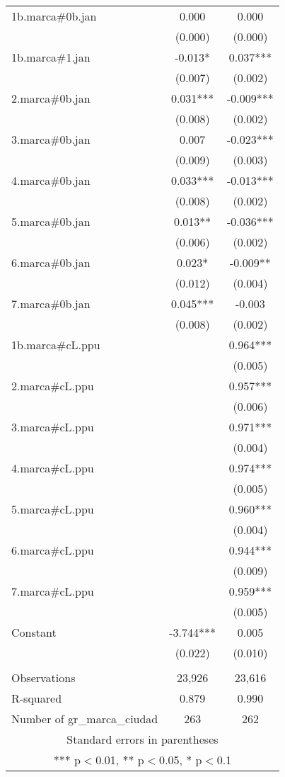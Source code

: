 \begin{tabular}{lcc}
1b.marca\#0b.jan & 0.000 & 0.000 \\
 & (0.000) & (0.000) \\
1b.marca\#1.jan & -0.013* & 0.037*** \\
 & (0.007) & (0.002) \\
2.marca\#0b.jan & 0.031*** & -0.009*** \\
 & (0.008) & (0.002) \\
3.marca\#0b.jan & 0.007 & -0.023*** \\
 & (0.009) & (0.003) \\
4.marca\#0b.jan & 0.033*** & -0.013*** \\
 & (0.008) & (0.002) \\
5.marca\#0b.jan & 0.013** & -0.036*** \\
 & (0.006) & (0.002) \\
6.marca\#0b.jan & 0.023* & -0.009** \\
 & (0.012) & (0.004) \\
7.marca\#0b.jan & 0.045*** & -0.003 \\
 & (0.008) & (0.002) \\
1b.marca\#cL.ppu &  & 0.964*** \\
 &  & (0.005) \\
2.marca\#cL.ppu &  & 0.957*** \\
 &  & (0.006) \\
3.marca\#cL.ppu &  & 0.971*** \\
 &  & (0.004) \\
4.marca\#cL.ppu &  & 0.974*** \\
 &  & (0.005) \\
5.marca\#cL.ppu &  & 0.960*** \\
 &  & (0.004) \\
6.marca\#cL.ppu &  & 0.944*** \\
 &  & (0.009) \\
7.marca\#cL.ppu &  & 0.959*** \\
 &  & (0.005) \\
Constant & -3.744*** & 0.005 \\
 & (0.022) & (0.010) \\
 &  &  \\
Observations & 23,926 & 23,616 \\
R-squared & 0.879 & 0.990 \\
 Number of gr\_marca\_ciudad & 263 & 262 \\ \hline
\multicolumn{3}{c}{ Standard errors in parentheses} \\
\multicolumn{3}{c}{ *** p$<$0.01, ** p$<$0.05, * p$<$0.1} \\
\end{tabular}
